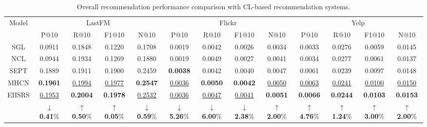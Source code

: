 \documentclass[letterpaper]{article} %
\begin{document}
\begin{table}[ht]\small
    \centering
    \flushleft
    \begin{tabular*}{\textwidth}{@{\extracolsep{\fill}}ccccc|cccc|cccc}
        \cmidrule(l){1-13}
        \multirow{2}{*}{Model} & \multicolumn{4}{c}{LastFM} & \multicolumn{4}{c}{Flickr} & \multicolumn{4}{c}{Yelp} \\ \cmidrule(l){2-5} \cmidrule(l){6-9} \cmidrule(l){10-13} \cmidrule(l){10-13}
            & P@10  & R@10  & F1@10  & N@10 & P@10  & R@10 & F1@10  & N@10 & P@10 & R@10 & F1@10  & N@10 \\ \cmidrule(l){1-13}
            SGL             &0.0911 &0.1848 &0.1220 &0.1708     &0.0019 &0.0042 &0.0026 &0.0034     &0.0033 &0.0276 &0.0059 &0.0145\\
            
            NCL            &0.0944 &0.1934 &0.1269 &0.1880     &0.0019 &0.0049 &0.0027 &0.0041     &0.0034 &0.0277 &0.0061 &0.0137\\ \cmidrule(l){1-13}
            
            SEPT        &0.1889 &0.1911 &0.1900 &0.2459     &\textbf{0.0038} &0.0042 &0.0040 &0.0047     &0.0061 &0.0239 &0.0097 &0.0148 \\

            MHCN        &\textbf{0.1961} &\underline{0.1994} &\underline{0.1977} &\textbf{0.2547}    &\underline{0.0036} &\textbf{0.0050} &\textbf{0.0042} &\underline{0.0050}     &\underline{0.0063} &\underline{0.0241} &\underline{0.0100} &\underline{0.0150}  \\ \cmidrule(l){1-13}
            
            \multirow{2}{*}{EIISRS}     &\underline{0.1953} &\textbf{0.2004} &\textbf{0.1978} &\underline{0.2532}    &\underline{0.0036} &\underline{0.0047} &\underline{0.0041} &\textbf{0.0051}     &\textbf{0.0066} &\textbf{0.0244} &\textbf{0.0103} &\textbf{0.0153}\\
            &$\boldsymbol{\downarrow}$\textbf{0.41}\% &$\boldsymbol{\uparrow}$\textbf{0.50}\% &$\boldsymbol{\uparrow}$\textbf{0.05}\% &$\boldsymbol{\downarrow}$\textbf{0.59}\%
            
            &$\boldsymbol{\downarrow}$\textbf{5.26}\% &$\boldsymbol{\downarrow}$\textbf{6.00}\% &$\boldsymbol{\downarrow}$\textbf{2.38}\%     &$\boldsymbol{\uparrow}$\textbf{2.00}\%

            &$\boldsymbol{\uparrow}$\textbf{4.76}\%            &$\boldsymbol{\uparrow}$\textbf{1.24}\% &$\boldsymbol{\uparrow}$\textbf{3.00}\% &$\boldsymbol{\uparrow}$\textbf{2.00}\% \\ \cmidrule(l){1-13}
           
    \end{tabular*}
    \caption{Overall recommendation performance comparison with CL-based recommendation systems.}
    \label{table_addition}
\end{table}
\end{document}
